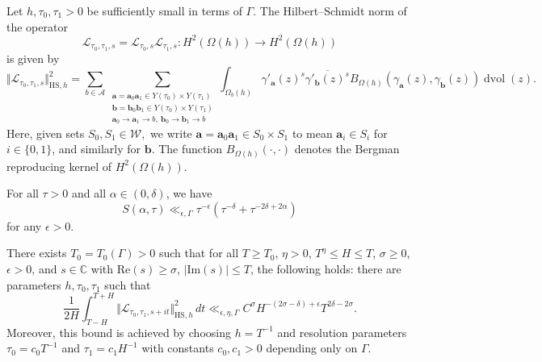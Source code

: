 \documentclass[10pt,a4paper]{amsart}
\DeclareMathOperator{\dvol}{dvol}
\newcommand{\Aa}{\textbf{a}}
\newcommand{\Bb}{\textbf{b}}
\newcommand{\CC}{\mathbb{C}}
\begin{document}
\begin{prop}\label{prop:HSnorm}
Let $h,\tau_0, \tau_1 > 0$ be sufficiently small in terms of $\Gamma$. The Hilbert--Schmidt norm of the operator
\[
\mathcal{L}_{\tau_0, \tau_1, s} = \mathcal{L}_{\tau_0, s} \mathcal{L}_{\tau_1, s}\colon H^2(\Omega(h)) \to H^2(\Omega(h))
\]
is given by
\[
\Vert \mathcal{L}_{\tau_0, \tau_1, s} \Vert_{\mathrm{HS},h}^2 = \sum_{b\in \mathcal{A}}  
\sum_{\substack{  
\Aa = \Aa_0\Aa_1 \in Y(\tau_0) \times Y(\tau_1)\\  
\Bb = \Bb_0\Bb_1 \in Y(\tau_0) \times Y(\tau_1) \\  
\Aa_0 \to \Aa_1 \to b,\ \Bb_0 \to \Bb_1 \to b } }  
\int_{\Omega_b(h)} \gamma'_{\Aa}(z)^s \overline{\gamma'_{\Bb}(z)^s}  
B_{\Omega(h)}(\gamma_{\Aa}(z), \gamma_{\Bb}(z)) \dvol(z).
\]
Here, given sets $S_0, S_1 \in \mathcal{W},$ we write $\Aa = \Aa_0\Aa_1 \in S_0 \times S_1$ to mean $\Aa_i \in S_i$ for $i \in \{0,1\}$, and similarly for $\Bb$. The function $B_{\Omega(h)}(\cdot,\cdot)$ denotes the Bergman reproducing kernel of $H^2(\Omega(h))$.
\end{prop}

\begin{lemma}\label{lem:weird_sum}
For all $\tau > 0$ and all $\alpha \in (0,\delta)$, we have
\begin{equation}\label{eq:weird_sum}
S(\alpha, \tau) \ll_{\epsilon, \Gamma} \tau^{-\epsilon} \left(\tau^{-\delta} +  \tau^{- 2\delta + 2\alpha} \right)
\end{equation}
for any $\epsilon > 0$.
\end{lemma}

\begin{prop}\label{prop:main_estimate}
There exists $T_0 = T_0(\Gamma) > 0$ such that for all $T \ge T_0$, $\eta > 0$, $T^{\eta} \le H \le T$, $\sigma \ge 0$, $\epsilon > 0$, and $s \in \CC$ with $\mathrm{Re}(s) \ge \sigma$, $|\mathrm{Im}(s)| \le T$, the following holds: there are parameters $h, \tau_0, \tau_1$ such that
\[
\frac{1}{2H} \int_{T-H}^{T+H} \Vert \mathcal{L}_{\tau_0, \tau_1, s+it} \Vert_{\mathrm{HS}, h}^2 \, dt 
\ll_{\epsilon,\eta ,\Gamma} C^{\sigma} H^{-(2\sigma-\delta)+\epsilon} T^{2\delta - 2\sigma}.
\]
Moreover, this bound is achieved by choosing $h = T^{-1}$ and resolution parameters $\tau_0 = c_0 T^{-1}$ and $\tau_1 = c_1 H^{-1}$ with constants $c_0, c_1 > 0$ depending only on $\Gamma$.
\end{prop}
\end{document}
